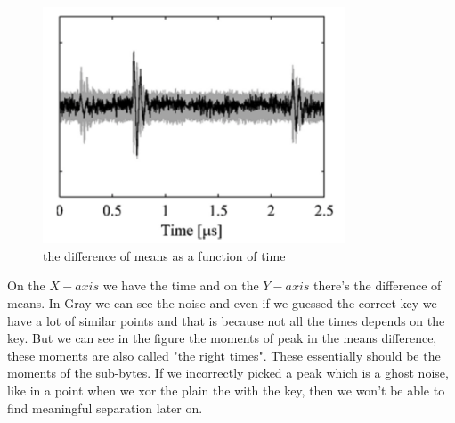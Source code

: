 \begin{figure}[H]
\centering
\includegraphics[width=0.8\textwidth]{images/Lecture6/meansDiffFigure.png}
\caption{the difference of means as a function of time}
\label{fig:meansDiffFigure}
\end{figure}

On the $X-axis$ we have the time and on the $Y-axis$ there's the difference of means. In Gray we can see the noise and even if we guessed the correct key we have a lot of similar points and that is because not all the times depends on the key. But we can see in the figure the moments of peak in the means difference, these moments are also called "the right times". These essentially should be the moments of the sub-bytes. If we incorrectly picked a peak which is a ghost noise, like in a point when we xor the plain the with the key, then we won't be able to find meaningful separation later on.

